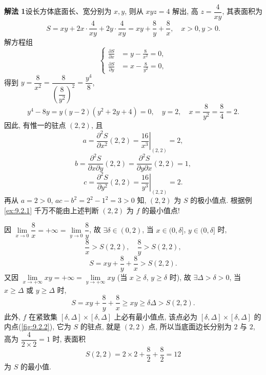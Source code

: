 \begin{solution}
\textbf{解法 1}\quad 设长方体底面长、宽分别为 $x, y$, 则从 $xyz = 4$ 解出, 高 $z = \dfrac{4}{xy}$, 其表面积为
\[
  S = xy + 2x \cdot \frac{4}{xy} + 2y \cdot \frac{4}{xy} = xy + \frac{8}{y} + \frac{8}{x}, \quad x > 0, y > 0.
\]
解方程组
\[
  \left\{\begin{aligned}
    \frac{\partial S}{\partial x} &= y - \frac{8}{x^{2}} = 0, \\
    \frac{\partial S}{\partial y} &= x - \frac{8}{y^{2}} = 0,
  \end{aligned}\right.
\]
得到 $y = \dfrac{8}{x^{2}} = \dfrac{8}{\left(\dfrac{8}{y^{2}}\right)^{2}} = \dfrac{y^{4}}{8}$,
\[
  y^{4} - 8y = y(y - 2)(y^{2} + 2y + 4) = 0, \quad y = 2, \quad x = \frac{8}{y^{2}} = \frac{8}{4} = 2.
\]
因此, 有惟一的驻点 $(2, 2)$, 且
\[
  a = \frac{\partial^{2}S}{\partial x^{2}}(2, 2) = \left.\frac{16}{x^{3}}\right|_{(2, 2)} = 2,
\]
\[
  b = \frac{\partial^{2}S}{\partial x\partial y}(2, 2) = \frac{\partial^{2}S}{\partial y\partial x}(2, 2) = 1,
\]
\[
  c = \frac{\partial^{2}S}{\partial y^{2}}(2, 2) = \left.\frac{16}{y^{3}}\right|_{(2, 2)} = 2.
\]
再从 $a = 2 > 0$, $ac - b^{2} = 2^{2} - 1^{2} = 3 > 0$ 知, $(2, 2)$ 为 $S$ 的极小值点. 根据例 \ref{ex:9.2.1} 千万不能由上述判断 $(2, 2)$ 为 $f$ 的最小值点!

因 $\lim\limits_{x \to 0}\dfrac{8}{x} = +\infty = \lim\limits_{y \to 0}\dfrac{8}{y}$, 故 $\exists \delta \in (0, 2)$, 当 $x \in (0, \delta]$, $y \in (0, \delta]$ 时,
\[
  \frac{8}{x} > S(2, 2), \quad \frac{8}{y} > S(2, 2),
\]
\[
  S = xy + \frac{8}{y} + \frac{8}{x} > S(2, 2).
\]
又因 $\lim\limits_{x \to +\infty} xy = +\infty = \lim\limits_{y \to +\infty} xy$ (当 $x \geqslant \delta$, $y \geqslant \delta$ 时), 故 $\exists \Delta > \delta > 0$, 当 $x \geqslant \Delta$ 或 $y \geqslant \Delta$ 时,
\[
  S = xy + \frac{8}{y} + \frac{8}{x} \geqslant xy \geqslant \delta\Delta > S(2, 2).
\]
此外, $f$ 在紧致集 $[\delta, \Delta] \times [\delta, \Delta]$ 上必有最小值点, 该点必为 $[\delta, \Delta] \times [\delta, \Delta]$ 的内点(\cref{fig:9.2.2}), 它为 $S$ 的驻点, 就是 $(2, 2)$ 点, 所以当底面边长分别为 $2$ 与 $2$, 高为 $\dfrac{4}{2 \times 2} = 1$ 时, 表面积
\[
  S(2, 2) = 2 \times 2 + \frac{8}{2} + \frac{8}{2} = 12
\]
为 $S$ 的最小值.

\begin{figure}[htbp]
  \centering
\end{figure}
\end{solution}
